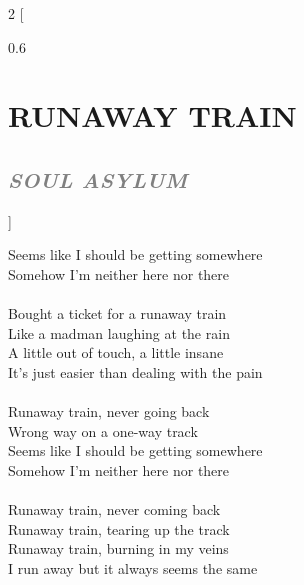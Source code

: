 \documentclass[100pt,a4paper]{report}
\newenvironment{song2}[2]
	{	
    	\begin{multicols*}{2}
		[
			\begin{spacing}{0.6}
				\section*{\LARGE\centering \MakeUppercase{\textbf{{#1}}}}
				\subsection*{\Large\centering \textit{\textcolor{gray}{\MakeUppercase{{#2}}}}}
			\end{spacing}
		]
		\Large
	}
	{
	\end{multicols*}
	\newpage
    }
\begin{document}
\begin{song2}{Runaway train}{Soul Asylum}
Seems like I should be getting somewhere\\
Somehow I'm neither here nor there\\
\\
Bought a ticket for a runaway train\\
Like a madman laughing at the rain\\
A little out of touch, a little insane\\
It's just easier than dealing with the pain\\
\\
Runaway train, never going back\\
Wrong way on a one-way track\\
Seems like I should be getting somewhere\\
Somehow I'm neither here nor there\\
\\
Runaway train, never coming back\\
Runaway train, tearing up the track\\
Runaway train, burning in my veins\\
I run away but it always seems the same
\end{song2}
\end{document}

